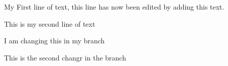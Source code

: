 \documentclass{article}
\begin{document}
My First line of text, this line has now been edited by adding this text.


This is my second line of text

I am changing this in my branch

This is the second changr in the branch
\end{document}
